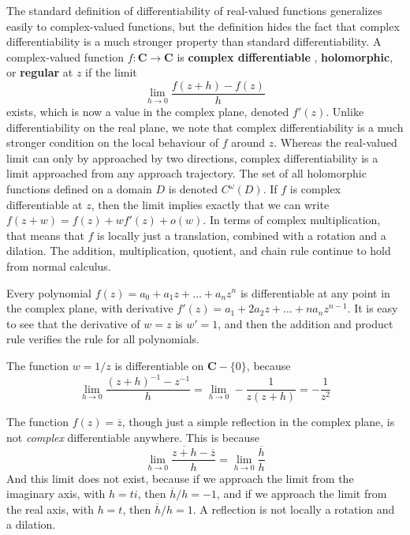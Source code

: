 %
The standard definition of differentiability of real-valued functions generalizes easily to complex-valued functions, but the definition hides the fact that complex differentiability is a much stronger property than standard differentiability. A complex-valued function $f: \mathbf{C} \to \mathbf{C}$ is {\bf complex differentiable
}, {\bf holomorphic}, or {\bf regular} at $z$ if the limit
%
\[ \lim_{h \to 0} \frac{f(z + h) - f(z)}{h} \]
%
exists, which is now a value in the complex plane, denoted $f'(z)$. Unlike differentiability on the real plane, we note that complex differentiability is a much stronger condition on the local behaviour of $f$ around $z$. Whereas the real-valued limit can only by approached by two directions, complex differentiability is a limit approached from any approach trajectory. The set of all holomorphic functions defined on a domain $D$ is denoted $C^\omega(D)$. If $f$ is complex differentiable at $z$, then the limit implies exactly that we can write $f(z + w) = f(z) + w f'(z) + o(w)$. In terms of complex multiplication, that means that $f$ is locally just a translation, combined with a rotation and a dilation. The addition, multiplication, quotient, and chain rule continue to hold from normal calculus.

\begin{example}
    Every polynomial $f(z) = a_0 + a_1z + \dots + a_nz^n$ is differentiable at any point in the complex plane, with derivative $f'(z) = a_1 + 2a_2z + \dots + na_nz^{n-1}$. It is easy to see that the derivative of $w = z$ is $w' = 1$, and then the addition and product rule verifies the rule for all polynomials.
\end{example}

\begin{example}
    The function $w = 1/z$ is differentiable on $\mathbf{C} - \{ 0 \}$, because
    \[ \lim_{h \to 0} \frac{(z + h)^{-1} - z^{-1}}{h} = \lim_{h \to 0} -\frac{1}{z(z+h)} = -\frac{1}{z^2} \]
\end{example}

\begin{example}
    The function $f(z) = \overline{z}$, though just a simple reflection in the complex plane, is not {\it complex} differentiable anywhere. This is because
    \[ \lim_{h \to 0} \frac{\overline{z + h} - \overline{z}}{h} = \lim_{h \to 0} \frac{\overline{h}}{h} \]
    And this limit does not exist, because if we approach the limit from the imaginary axis, with $h = ti$, then $\overline{h}/h = -1$, and if we approach the limit from the real axis, with $h = t$, then $\overline{h}/h = 1$. A reflection is not locally a rotation and a dilation.
\end{example}

